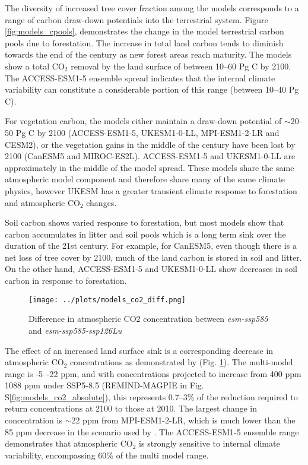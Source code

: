 \documentclass[]{article}
\begin{document}
The diversity of increased tree cover fraction among the models corresponds to a range of carbon draw-down potentials into the terrestrial system.
Figure \ref{fig:models_cpools}, demonstrates the change in the model terrestrial carbon pools due to forestation.
The increase in total land carbon tends to diminish towards the end of the century as new forest areas reach maturity.
The models show a total CO$_2$ removal by the land surface of between 10--60 Pg C by 2100.
The ACCESS-ESM1-5 ensemble spread indicates that the internal climate variability can constitute a considerable portion of this range (between 10--40 Pg C).

For vegetation carbon, the models either maintain a draw-down potential of $\sim$20--50 Pg C by 2100 (ACCESS-ESM1-5, UKESM1-0-LL, MPI-ESM1-2-LR and CESM2), or the vegetation gains in the middle of the century have been lost by 2100 (CanESM5 and MIROC-ES2L).
ACCESS-ESM1-5 and UKESM1-0-LL are approximately in the middle of the model spread.
These models share the same atmospheric model component and therefore share many of the same climate physics, however UKESM has a greater transient climate response to forestation and atmospheric CO$_2$ changes.

Soil carbon shows varied response to forestation, but most models show that carbon accumulates in litter and soil pools which is a long term sink over the duration of the 21st century.
For example, for CanESM5, even though there is a net loss of tree cover by 2100, much of the land carbon is stored in soil and litter.
On the other hand, ACCESS-ESM1-5 and UKESM1-0-LL show decreases in soil carbon in response to forestation.

\begin{figure}
    \centering
    \texttt{[image: ../plots/models\_co2\_diff.png]}
    \caption{Difference in atmospheric CO2 concentration between \textit{esm-ssp585} and \textit{esm-ssp585-ssp126Lu}}
    \label{fig:models_CO2}
\end{figure}

The effect of an increased land surface sink is a corresponding decrease in atmospheric CO$_2$ concentrations as demonstrated by (Fig. \ref{fig:models_CO2}).
The multi-model range is -5--{-22} ppm, and with concentrations projected to increase from 400 ppm 1088 ppm under SSP5-8.5 (REMIND-MAGPIE in Fig. S\ref{fig:models_co2_absolute}), this represents 0.7–3\% of the reduction required to return concentrations at 2100 to those at 2010.
The largest change in concentration is $\sim$22 ppm from MPI-ESM1-2-LR, which is much lower than the 85 ppm decrease in the scenario used by \cite{sonntag_reforestation_2016}.
The ACCESS-ESM1-5 ensemble range demonstrates that atmospheric CO$_2$ is strongly sensitive to internal climate variability, encompassing 60\% of the multi model range.
\end{document}
